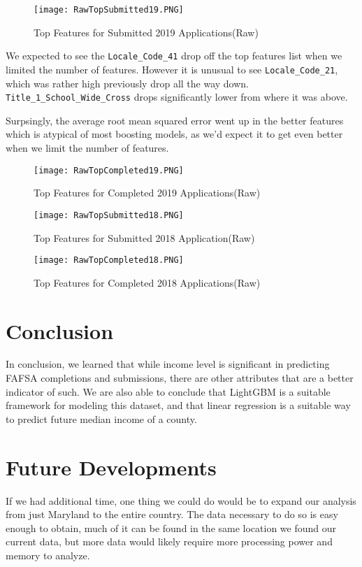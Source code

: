 \documentclass[12pt]{article}
\begin{document}
\begin{figure}[!htb]
  \centering
  \texttt{[image: RawTopSubmitted19.PNG]}
  \caption{Top Features for Submitted 2019 Applications(Raw)}
  \label{fig:feature_importance}
\end{figure}

We expected to see the \texttt{Locale\_Code\_41} drop off the top features list when 
we limited the number of features. However it is unusual to see \texttt{Locale\_Code\_21}, 
which was rather high previously drop all the way down. \texttt{Title\_1\_School\_Wide\_Cross}
drops significantly lower from where it was above.

Surpsingly, the average root mean squared error went up in the better features which is 
atypical of most boosting models, as we'd expect it to get even better when we limit
the number of features.

\begin{figure}[!htb]
  \centering
  \texttt{[image: RawTopCompleted19.PNG]}
  \caption{Top Features for Completed 2019 Applications(Raw)}
  \label{fig:feature_importance}
\end{figure}

\begin{figure}[!htb]
  \centering
  \texttt{[image: RawTopSubmitted18.PNG]}
  \caption{Top Features for Submitted 2018 Application(Raw)}
  \label{fig:feature_importance}
\end{figure}

\begin{figure}[!htb]
  \centering
  \texttt{[image: RawTopCompleted18.PNG]}
  \caption{Top Features for Completed 2018 Applications(Raw)}
  \label{fig:feature_importance}
\end{figure}


\section{Conclusion}
In conclusion, we learned that while income level is significant in predicting 
FAFSA completions and submissions, there are other attributes that are a better 
indicator of such. We are also able to conclude that LightGBM is a suitable
framework for modeling this dataset, and that linear regression is a suitable
way to predict future median income of a county.

\section{Future Developments}
If we had additional time, one thing we could do would be to expand our analysis
from just Maryland to the entire country. The data necessary to do so is easy
enough to obtain, much of it can be found in the same location we found our current
data, but more data would likely require more processing power and memory to analyze.\\
\end{document}
